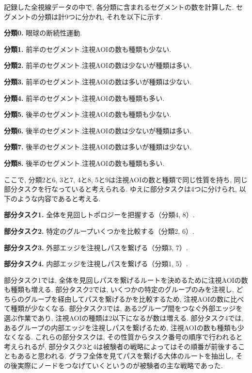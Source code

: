 \documentclass{kuee}
\begin{document}
記録した全視線データの中で, 各分類に含まれるセグメントの数を計算した.
セグメントの分類は計9つに分かれ, それを以下に示す.
\begin{description}
  \item{\bf 分類0.} 眼球の断続性運動.
  \item{\bf 分類1.} 前半のセグメント.注視AOIの数も種類も少ない.
  \item{\bf 分類2.} 前半のセグメント.注視AOIの数は少ないが種類は多い.
  \item{\bf 分類3.} 前半のセグメント.注視AOIの数は多いが種類は少ない.
  \item{\bf 分類4.} 前半のセグメント.注視AOIの数も種類も多い.
  \item{\bf 分類5.} 後半のセグメント.注視AOIの数も種類も少ない.
  \item{\bf 分類6.} 後半のセグメント.注視AOIの数は少ないが種類は多い.
  \item{\bf 分類7.} 後半のセグメント.注視AOIの数は多いが種類は少ない.
  \item{\bf 分類8.} 後半のセグメント.注視AOIの数も種類も多い.
\end{description}
ここで, 分類2と6, 3と7, 4と8, 5と9は注視AOIの数と種類で同じ性質を持ち, 同じ部分タスクを行なっていると考えられる.
ゆえに部分タスクは4つに分けられ, 以下のような内容であると考える.
\begin{description}
  \item{\bf 部分タスク1.} 全体を見回しトポロジーを把握する（分類4, 8）.
  \item{\bf 部分タスク2.} 特定のグループいくつかを比較する（分類2, 6）.
  \item{\bf 部分タスク3.} 外部エッジを注視しパスを繋げる（分類3, 7）.
  \item{\bf 部分タスク4.} 内部エッジを注視しパスを繋げる（分類1, 5）.
\end{description}
部分タスク1では, 全体を見回しパスを繋げるルートを決めるために注視AOIの数も種類も増える.
部分タスク2では, いくつかの特定のグループのみを注視し, どちらのグループを経由してパスを繋げるかを比較するため, 注視AOIの数に比べて種類が少なくなる.
部分タスク3では, ある2グループ間をつなぐ外部エッジを選ぶ作業であり, 注視AOIの種類は2以下になるが数は増える.
部分タスク4では, あるグループの内部エッジを注視しパスを繋げるため, 注視AOIの数も種類も少なくなる.
これらの部分タスクは, その性質からタスク番号の順序で行われると考えられるが, 部分タスク3と4は被験者の戦略によってはその順番が前後することもあると思われる.
グラフ全体を見てパスを繋げる大体のルートを抽出し, その後実際にノードをつなげていくというのが被験者の主な戦略であった.
\end{document}

